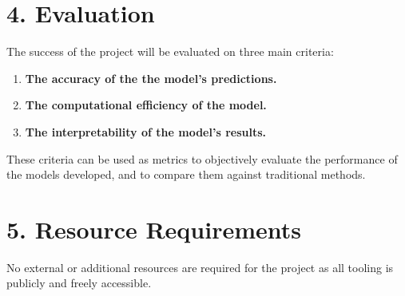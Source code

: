 \documentclass[11pt, a4paper, twoside, openright]{report}
\begin{document}
\section*{4. Evaluation}

The success of the project will be evaluated on three main
criteria:
\begin{enumerate}
\item \textbf{The accuracy of the the model's predictions.}
\item \textbf{The computational efficiency of the model.}
\item \textbf{The interpretability of the model's results.}
\end{enumerate}
These criteria can be used as metrics to objectively
evaluate the performance of the models developed, and
to compare them against traditional methods.

\section*{5. Resource Requirements}

No external or additional resources are required for the
project as all tooling is publicly and freely accessible.

\backmatter

%


\end{document}
